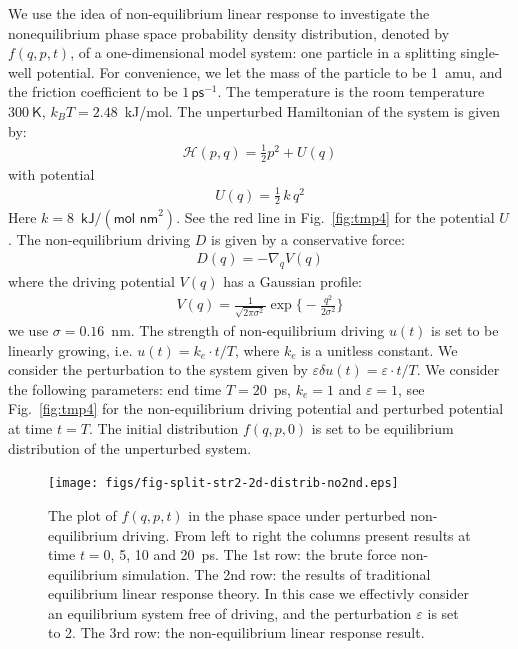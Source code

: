 \documentclass[]{tMPH2e}
\newcommand{\mh}{\mathcal H}
\newcommand{\eps}{\varepsilon}
\begin{document}
We use the idea of non-equilibrium linear response to investigate the
nonequilibrium phase space probability density distribution, denoted by $f(q, p, t)$, of a one-dimensional model system: one particle in a
splitting single-well potential.  For convenience, we let the mass of
the particle to be 1~\textsf{amu}, and the friction coefficient to be
$1\,\textsf{ps}^{-1}$.
The temperature is the
room temperature $300\ \textsf{K}$, $k_BT = 2.48$~\textsf{kJ/mol}.
The unperturbed Hamiltonian of the system is
given by:
\begin{align}
  \mh ( p,  q) = \frac 12  p^2 + U( q) 
\end{align}
with potential
\begin{align}
  U( q) = \frac12\,k\, q^2 
\end{align}
Here $k = 8$~$\textsf{kJ} / (\textsf{mol nm}^2)$.
See the red line in Fig.~\ref{fig:tmp4} for the  potential $U$.
The non-equilibrium driving $ D$ is given by a conservative force:
\begin{align}
   D( q) = -\nabla_{ q} V( q) 
\end{align}
where the driving potential $V( q)$ has a Gaussian profile:
\begin{align}
  V( q) = \frac{1}{\sqrt{2\pi \sigma^2}}
  \exp\Big\{-\frac{ q^2}{2\sigma^2}\Big\}
\end{align}
we use $\sigma = 0.16$~\textsf{nm}.  The strength of non-equilibrium
driving $u(t)$ is set to be linearly growing, i.e. $ u(t) = k_e\cdot t/T$,
where $k_e$ is a unitless constant.
We
consider the perturbation to the system given by $\eps\delta u(t) = \eps \cdot t/T$.
We consider the following parameters: end time $T = 20$~\textsf{ps}, 
$k_e = 1$ and $\eps = 1$, see Fig.~\ref{fig:tmp4}
for the non-equilibrium driving potential and perturbed
potential at time $t = T$. The initial distribution $f(q, p, 0)$ is set to
be equilibrium distribution of the unperturbed system.

\begin{figure}
  \centering
  \texttt{[image: figs/fig-split-str2-2d-distrib-no2nd.eps]}
  \caption{ The plot of $ f(q,p,t)$ in the phase
    space under perturbed non-equilibrium driving. From left to right the columns present results at time $t =
    0$, 5, 10 and 20~\textsf{ps}.  The 1st row: the brute force
    non-equilibrium simulation. The 2nd row: the results of
    traditional equilibrium linear response theory. In this case we
    effectivly consider an equilibrium system free of driving, and the perturbation $\eps$ is set to 2.  The 3rd row: the
    non-equilibrium linear response result.  }
  \label{fig:tmp6}
\end{figure}
\end{document}
